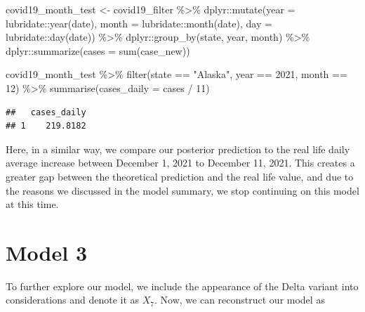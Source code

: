 \documentclass[
]{book}
\newenvironment{Shaded}{\begin{snugshade}}{\end{snugshade}}
\newcommand{\AttributeTok}[1]{\textcolor[rgb]{0.77,0.63,0.00}{#1}}
\newcommand{\DecValTok}[1]{\textcolor[rgb]{0.00,0.00,0.81}{#1}}
\newcommand{\FunctionTok}[1]{\textcolor[rgb]{0.00,0.00,0.00}{#1}}
\newcommand{\NormalTok}[1]{#1}
\newcommand{\OtherTok}[1]{\textcolor[rgb]{0.56,0.35,0.01}{#1}}
\newcommand{\SpecialCharTok}[1]{\textcolor[rgb]{0.00,0.00,0.00}{#1}}
\newcommand{\StringTok}[1]{\textcolor[rgb]{0.31,0.60,0.02}{#1}}
\begin{document}
\begin{Shaded}
\begin{Highlighting}[]
\NormalTok{covid19\_month\_test }\OtherTok{\textless{}{-}}\NormalTok{ covid19\_filter }\SpecialCharTok{\%\textgreater{}\%}
\NormalTok{  dplyr}\SpecialCharTok{::}\FunctionTok{mutate}\NormalTok{(}\AttributeTok{year =}\NormalTok{ lubridate}\SpecialCharTok{::}\FunctionTok{year}\NormalTok{(date), }
                \AttributeTok{month =}\NormalTok{ lubridate}\SpecialCharTok{::}\FunctionTok{month}\NormalTok{(date), }
                \AttributeTok{day =}\NormalTok{ lubridate}\SpecialCharTok{::}\FunctionTok{day}\NormalTok{(date)) }\SpecialCharTok{\%\textgreater{}\%}
\NormalTok{  dplyr}\SpecialCharTok{::}\FunctionTok{group\_by}\NormalTok{(state, year, month) }\SpecialCharTok{\%\textgreater{}\%}
\NormalTok{  dplyr}\SpecialCharTok{::}\FunctionTok{summarize}\NormalTok{(}\AttributeTok{cases =} \FunctionTok{sum}\NormalTok{(case\_new)) }

\NormalTok{covid19\_month\_test }\SpecialCharTok{\%\textgreater{}\%} 
  \FunctionTok{filter}\NormalTok{(state }\SpecialCharTok{==} \StringTok{"Alaska"}\NormalTok{, year }\SpecialCharTok{==} \DecValTok{2021}\NormalTok{, month }\SpecialCharTok{==} \DecValTok{12}\NormalTok{) }\SpecialCharTok{\%\textgreater{}\%}
  \FunctionTok{summarise}\NormalTok{(}\AttributeTok{cases\_daily =}\NormalTok{ cases }\SpecialCharTok{/} \DecValTok{11}\NormalTok{)}
\end{Highlighting}
\end{Shaded}

\begin{verbatim}
##   cases_daily
## 1    219.8182
\end{verbatim}

Here, in a similar way, we compare our posterior prediction to the real life daily average increase between December 1, 2021 to December 11, 2021. This creates a greater gap between the theoretical prediction and the real life value, and due to the reasons we discussed in the model summary, we stop continuing on this model at this time.

\hypertarget{model-3}{%
\section{Model 3}\label{model-3}}

To further explore our model, we include the appearance of the Delta variant into considerations and denote it as \(X_7\). Now, we can reconstruct our model as
\end{document}
